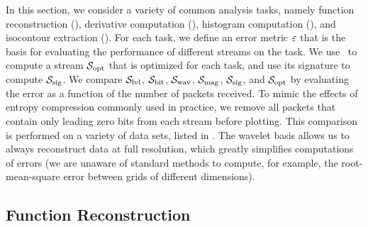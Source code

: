In this section, we consider a variety of common analysis tasks, namely function reconstruction
(), derivative computation (), histogram
computation (), and isocontour extraction (). For each
task, we define an error metric $\err$ that is the basis for evaluating the performance of different
streams on the task. We use~ to compute a stream $\sopt$ that is optimized for each
task, and use its signature to compute $\ssig$. We compare $\slvl$, $\sbit$, $\swav$, $\smag$,
$\ssig$, and $\sopt$ by evaluating the error as a function of the number of packets received. To
mimic the effects of entropy compression commonly used in practice, we remove all packets that
contain only leading zero bits from each stream before plotting. This comparison is performed on a
variety of data sets, listed in . The wavelet basis allows us to always
reconstruct data at full resolution, which greatly simplifies computations of errors (we are unaware
of standard methods to compute, for example, the root-mean-square error between grids of different
dimensions).

\subsection{Function Reconstruction}\label{sec:rmse-optimized}

